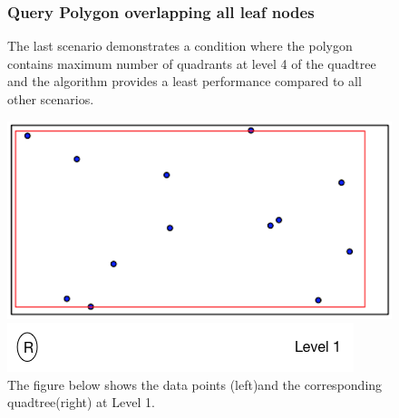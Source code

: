 \documentclass{article}
\begin{document}
\clearpage
\begin{figure}[H]
\subsubsection{Query Polygon overlapping all leaf nodes}
The last scenario demonstrates a condition where the polygon contains maximum number of quadrants at level 4 of the quadtree and the algorithm provides a least performance compared to all other scenarios.
\vspace{1cm}

  \centering
  \begin{minipage}[b]{0.35\textwidth}
    \includegraphics[width=\textwidth]{4Quad1_1}  
  \end{minipage}
  \hfill
  \begin{minipage}[b]{0.6\textwidth}
    \includegraphics[width=\textwidth]{1_1Quad_1_tree}
  \end{minipage}
  \caption{The figure below shows the data points (left)and the corresponding quadtree(right) at Level 1.}
\end{figure}

\vspace{2cm}
\end{document}
